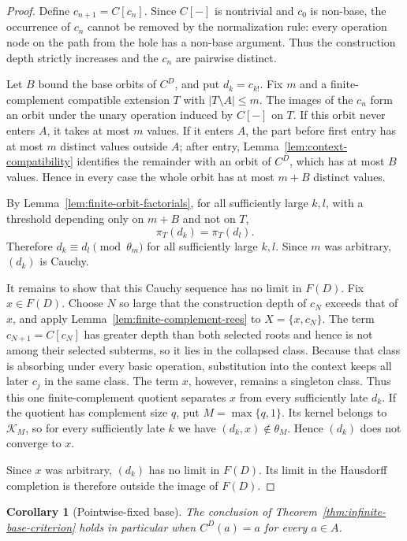 \documentclass{birkau}
\newtheorem{corollary}[theorem]{Corollary}
\theoremstyle{definition}
\theoremstyle{remark}
\begin{document}
\begin{proof}
Define $c_{n+1}=C[c_n]$.  Since $C[-]$ is nontrivial and $c_0$ is non-base,
the occurrence of $c_n$ cannot be removed by the normalization rule: every
operation node on the path from the hole has a non-base argument.  Thus the
construction depth strictly increases and the $c_n$ are pairwise distinct.

Let $B$ bound the base orbits of $C^D$, and put $d_k=c_{k!}$.  Fix $m$ and a
finite-complement compatible extension $T$ with $|T\setminus A|\le m$.  The
images of the $c_n$ form an orbit under the unary operation induced by $C[-]$
on $T$.  If this orbit never enters $A$, it takes at most $m$ values.  If it
enters $A$, the part before first entry has at most $m$ distinct values outside
$A$; after entry, Lemma~\ref{lem:context-compatibility} identifies the remainder
with an orbit of $C^D$, which has at most $B$ values.  Hence in every case the
whole orbit has at most $m+B$ distinct values.

By Lemma~\ref{lem:finite-orbit-factorials}, for all sufficiently large $k,l$,
with a threshold depending only on $m+B$ and not on $T$,
\[
 \pi_T(d_k)=\pi_T(d_l).
\]
Therefore $d_k\equiv d_l\pmod{\theta_m}$ for all sufficiently large $k,l$.
Since $m$ was arbitrary, $(d_k)$ is Cauchy.

It remains to show that this Cauchy sequence has no limit in $F(D)$.  Fix
$x\in F(D)$.  Choose $N$ so large that the construction depth of $c_N$ exceeds
that of $x$, and apply Lemma~\ref{lem:finite-complement-rees} to
$X=\{x,c_N\}$.  The term $c_{N+1}=C[c_N]$ has greater depth than both selected
roots and hence is not among their selected subterms, so it lies in the
collapsed class.  Because that class is absorbing under every basic operation,
substitution into the context keeps all later $c_j$ in the same class.  The
term $x$, however, remains a singleton class.  Thus this one
finite-complement quotient separates $x$ from every sufficiently late $d_k$.
If the quotient has complement size $q$, put $M=\max\{q,1\}$.  Its kernel
belongs to $\mathcal K_M$, so for every sufficiently late $k$ we have
$(d_k,x)\notin\theta_M$.  Hence $(d_k)$ does not converge to $x$.

Since $x$ was arbitrary, $(d_k)$ has no limit in $F(D)$.  Its limit in the
Hausdorff completion is therefore outside the image of $F(D)$.
\end{proof}

\begin{corollary}[Pointwise-fixed base]\label{cor:base-fixing}
The conclusion of Theorem~\ref{thm:infinite-base-criterion} holds in particular
when $C^D(a)=a$ for every $a\in A$.
\end{corollary}
\end{document}
